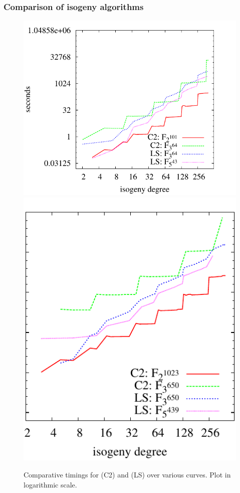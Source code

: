 \documentclass[10pt,usepdftitle=false]{beamer}
\begin{document}
\begin{frame}
  \frametitle{Comparison of isogeny algorithms}
  
  \begin{figure}
    \centering
    \includegraphics[height=0.5\textwidth]{../isogeny/C2-LS}
    \includegraphics[height=0.5\textwidth]{../isogeny/C2-LS2}
    \caption{Comparative timings for \cite{couveignes96} (C2) and
      \cite{lercier+sirvent08} (LS) over various curves. Plot in
      logarithmic scale.}
  \label{fig:comp}
\end{figure}
\end{frame}
 
\end{document}
